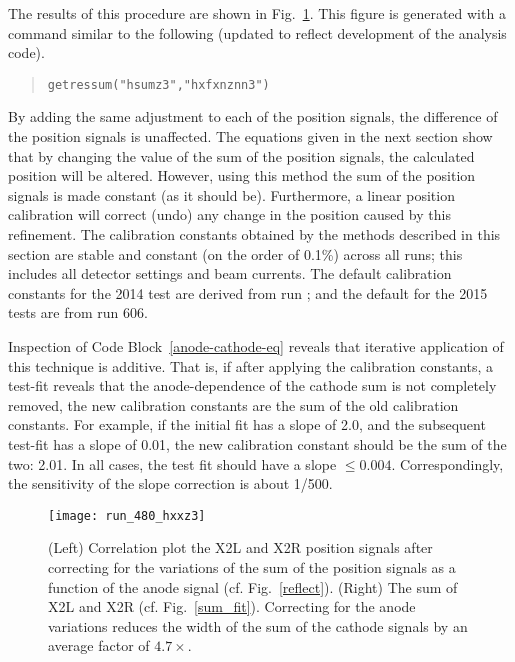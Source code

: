 The results of this procedure are shown in Fig.~\ref{pos_cor}. This figure is generated with a command similar to the following (updated to reflect development of the analysis code).
\vsetroot
\begin{quote}
\begin{Verbatim}[firstnumber=0]
getressum("hsumz3","hxfxnznn3")
\end{Verbatim}
\end{quote}
\vsetnone
 By adding the same adjustment to each of the position signals, the difference of the position signals is unaffected.  The equations given in the next section show that by changing the value of the sum of the position signals, the calculated position will be altered.  However, using this method the sum of the position signals is made constant (as it should be). Furthermore, a linear position calibration will correct (undo) any change in the position caused by this refinement. The calibration constants obtained by the methods described in this section are stable and constant (on the order of 0.1\%) across all runs; this includes all detector settings and beam currents. The default calibration constants for the 2014 test are derived from run ; and the default for the 2015 tests are from run 606.

Inspection of Code Block~\ref{anode-cathode-eq} reveals that iterative application of this technique is additive. That is, if after applying the calibration constants, a test-fit reveals that the anode-dependence of the cathode sum is not completely removed, the new calibration constants are the sum of the old calibration constants. For example, if the initial fit has a slope of 2.0, and the subsequent test-fit has a slope of 0.01, the new calibration constant should be the sum of the two: 2.01. In all cases, the test fit should have a slope $\leq0.004$. Correspondingly, the sensitivity of the slope correction is about %
1/500.
\begin{figure}
\centering
\texttt{[image: run\_480\_hxxz3]}\hspace{\fill}
\caption{(Left) Correlation plot the X2L and X2R position signals after correcting for the variations of the sum of the position signals as a function of the anode signal (cf. Fig.~\ref{reflect}). %
  (Right) The sum of X2L and X2R (cf. Fig.~\ref{sum_fit}). %
  Correcting for the anode variations reduces the width of the sum of the cathode signals by an average factor of $4.7\times$.}
\label{pos_cor}
\end{figure}

